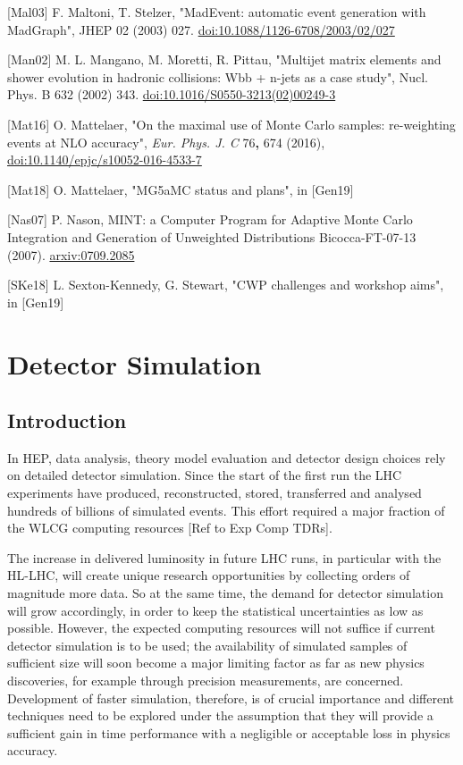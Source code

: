 \documentclass[11pt,a4paper]{article}
\begin{document}
{[}Mal03{]} F. Maltoni, T. Stelzer, "MadEvent: automatic event
generation with MadGraph", JHEP 02 (2003) 027.
\href{https://doi.org/10.1088/1126-6708/2003/02/027}{{doi:10.1088/1126-6708/2003/02/027}}

{[}Man02{]} M. L. Mangano, M. Moretti, R. Pittau, "Multijet matrix
elements and shower evolution in hadronic collisions: Wbb + n-jets as a
case study", Nucl. Phys. B 632 (2002) 343.
\href{https://doi.org/10.1016/S0550-3213(02)00249-3}{{doi:10.1016/S0550-3213(02)00249-3}}

{[}Mat16{]} O. Mattelaer, "On the maximal use of Monte Carlo samples:
re-weighting events at NLO accuracy", \emph{Eur. Phys. J. C}
76\textbf{,} 674 (2016),
\href{https://doi.org/10.1140/epjc/s10052-016-4533-7}{{doi:10.1140/epjc/s10052-016-4533-7}}

{[}Mat18{]} O. Mattelaer, "MG5aMC status and plans", in {[}Gen19{]}

{[}Nas07{]} P. Nason, MINT: a Computer Program for Adaptive Monte Carlo
Integration and Generation of Unweighted Distributions Bicocca-FT-07-13
(2007). \href{https://arxiv.org/abs/0709.2085}{{arxiv:0709.2085}}

{[}SKe18{]} L. Sexton-Kennedy, G. Stewart, "CWP challenges and workshop
aims", in {[}Gen19{]}

\hypertarget{detector-simulation}{%
\section{Detector Simulation}\label{detector-simulation}}

\hypertarget{introduction-2}{%
\subsection{Introduction}\label{introduction-2}}

In HEP, data analysis, theory model evaluation and detector design
choices rely on detailed detector simulation. Since the start of the
first run the LHC experiments have produced, reconstructed, stored,
transferred and analysed hundreds of billions of simulated events. This
effort required a major fraction of the WLCG computing resources {[}Ref
to Exp Comp TDRs{]}.

The increase in delivered luminosity in future LHC runs, in particular
with the HL-LHC, will create unique research opportunities by collecting
orders of magnitude more data. So at the same time, the demand for
detector simulation will grow accordingly, in order to keep the
statistical uncertainties as low as possible. However, the expected
computing resources will not suffice if current detector simulation is
to be used; the availability of simulated samples of sufficient size
will soon become a major limiting factor as far as new physics
discoveries, for example through precision measurements, are concerned.
Development of faster simulation, therefore, is of crucial importance
and different techniques need to be explored under the assumption that
they will provide a sufficient gain in time performance with a
negligible or acceptable loss in physics accuracy.
\end{document}

